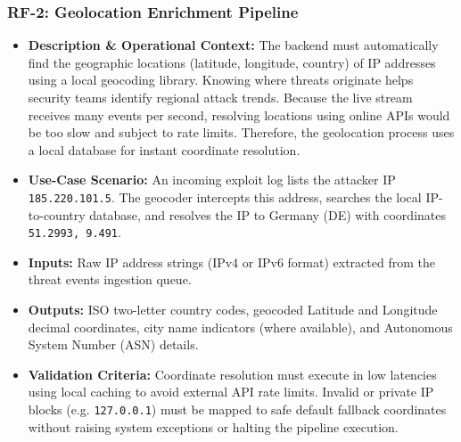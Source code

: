 \subsubsection{RF-2: Geolocation Enrichment Pipeline}
\begin{itemize}
    \item \textbf{Description \& Operational Context:} The backend must automatically find the geographic locations (latitude, longitude, country) of IP addresses using a local geocoding library. Knowing where threats originate helps security teams identify regional attack trends. Because the live stream receives many events per second, resolving locations using online APIs would be too slow and subject to rate limits. Therefore, the geolocation process uses a local database for instant coordinate resolution.
    \item \textbf{Use-Case Scenario:} An incoming exploit log lists the attacker IP \texttt{185.220.101.5}. The geocoder intercepts this address, searches the local IP-to-country database, and resolves the IP to Germany (DE) with coordinates \texttt{51.2993, 9.491}.
    \item \textbf{Inputs:} Raw IP address strings (IPv4 or IPv6 format) extracted from the threat events ingestion queue.
    \item \textbf{Outputs:} ISO two-letter country codes, geocoded Latitude and Longitude decimal coordinates, city name indicators (where available), and Autonomous System Number (ASN) details.
    \item \textbf{Validation Criteria:} Coordinate resolution must execute in low latencies using local caching to avoid external API rate limits. Invalid or private IP blocks (e.g. \texttt{127.0.0.1}) must be mapped to safe default fallback coordinates without raising system exceptions or halting the pipeline execution.
\end{itemize}

